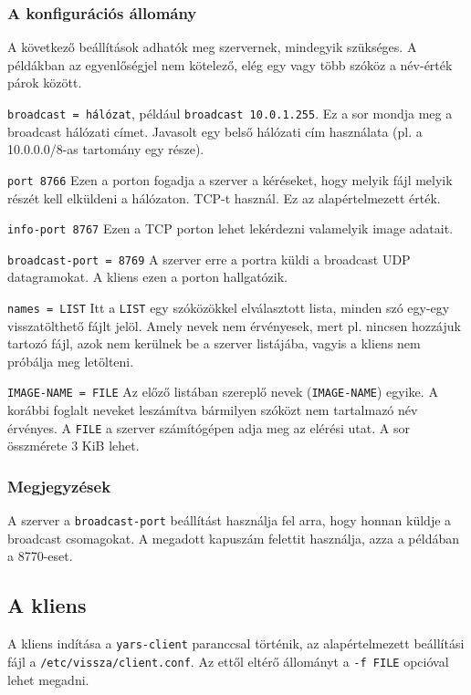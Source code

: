 \documentclass[fleqn,10pt,a4paper,titlepage]{article}
\begin{document}
  \subsubsection{A konfigurációs állomány}
  A következő beállítások adhatók meg szervernek, mindegyik szükséges. A példákban az egyenlőségjel nem kötelező, elég
  egy vagy több szóköz a név-érték párok között.
  
  \texttt{broadcast = hálózat}, például \texttt{broadcast 10.0.1.255}. Ez a sor mondja meg a broadcast hálózati
  címet. Javasolt egy belső hálózati cím használata (pl. a 10.0.0.0/8-as tartomány egy része).


  \texttt{port 8766} Ezen a porton fogadja a szerver a kéréseket, hogy melyik fájl melyik részét kell elküldeni a
  hálózaton. TCP-t használ. Ez az alapértelmezett érték.
  
  \texttt{info-port 8767} Ezen a TCP porton lehet lekérdezni valamelyik image adatait.
  
  \texttt{broadcast-port = 8769} A szerver erre a portra küldi a broadcast UDP datagramokat. A kliens ezen a porton
  hallgatózik. 

  \texttt{names = LIST} Itt a \texttt{LIST} egy szóközökkel elválasztott lista, minden szó egy-egy visszatölthető fájlt
  jelöl. Amely nevek nem érvényesek, mert pl. nincsen hozzájuk tartozó fájl, azok nem kerülnek be a szerver listájába,
  vagyis a kliens nem próbálja meg letölteni.
  
  \texttt{IMAGE-NAME = FILE} Az előző listában szereplő nevek (\texttt{IMAGE-NAME}) egyike. A  korábbi foglalt neveket
  leszámítva bármilyen szóközt nem tartalmazó név érvényes. A \texttt{FILE} a szerver számítógépen adja meg az elérési
  utat. A sor összmérete 3 KiB lehet.

  \subsubsection{Megjegyzések}
  A szerver a \texttt{broadcast-port} beállítást használja fel arra, hogy honnan küldje a broadcast csomagokat. A
  megadott kapuszám felettit használja, azza a példában a 8770-eset.
  
  \subsection{A kliens}
  A kliens indítása a \texttt{yars-client} paranccsal történik, az alapértelmezett beállítási fájl a
  \texttt{/etc/vissza/client.conf}. Az ettől eltérő állományt a \texttt{-f FILE} opcióval lehet megadni.
  
\end{document}
